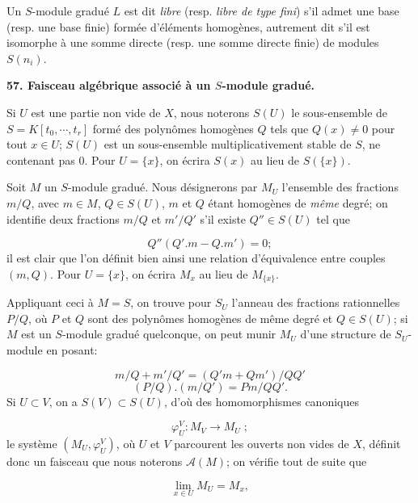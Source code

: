 Un $S$-module gradué $L$ est dit \textit{libre} (resp. \textit{libre de type fini}) s'il admet une base (resp. une base finie) formée d'éléments homogènes, autrement dit s'il est isomorphe à une somme directe (resp. une somme directe finie) de modules $S(n_i)$.


\textbf{57. Faisceau algébrique associé à un $S$-module gradué.}

Si $U$ est une partie non vide de $X$, nous noterons $S(U)$ le sous-ensemble de $S = K[t_0 , \cdots , t_r]$ formé des polynômes homogènes $Q$ tels que $Q(x) \neq 0$ pour tout $x \in U$; $S(U)$ est un sous-ensemble multiplicativement stable de $S$, ne contenant pas 0. Pour $U = \{x\}$, on écrira $S(x)$ au lieu de $S(\{x\})$.

Soit $M$ un $S$-module gradué. Nous désignerons par $M_U$ l'ensemble des fractions $m/Q$, avec $m \in M$, $Q \in S(U)$, $m$ et $Q$ étant homogènes de \textit{même} degré; on identifie deux fractions $m/Q$ et $m'/Q'$ s'il existe $Q'' \in S(U)$ tel que

\begin{equation*}
Q''(Q'.m - Q.m') = 0;
\end{equation*}
il est clair que l'on définit bien ainsi une relation d'équivalence entre couples $(m, Q)$. Pour $U = \{x\}$, on écrira $M_x$ au lieu de $M_{\{x\}}$.

Appliquant ceci à $M = S$, on trouve pour $S_U$ l'anneau des fractions rationnelles $P/Q$, où $P$ et $Q$ sont des polynômes homogènes de même degré et $Q \in S(U)$; si $M$ est un $S$-module gradué quelconque, on peut munir $M_U$ d'une structure de $S_U$-module en posant:

\begin{equation*}
m/Q + m'/Q' = (Q'm + Qm')/QQ'
\end{equation*}
\begin{equation*}
(P/Q).(m/Q') = Pm/QQ'.
\end{equation*}
Si $U \subset V$, on a $S(V) \subset S(U)$, d'où des homomorphismes canoniques

\begin{equation*}
\varphi_U^V : M_V \to M_U \; ;
\end{equation*}
le système $(M_U , \varphi_U^V)$, où $U$ et $V$ parcourent les ouverts non vides de $X$, définit donc un faisceau que nous noterons $\mathcal{A}(M)$; on vérifie tout de suite que

\begin{equation*}
\lim_{x \in U} M_U = M_x ,
\end{equation*}


